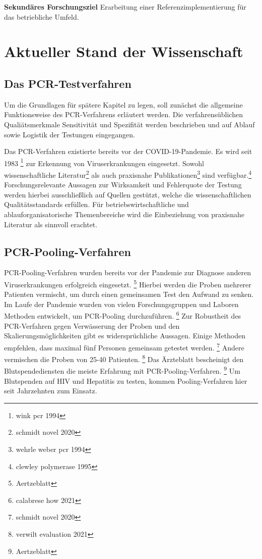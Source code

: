 \textbf{Sekundäres Forschungsziel}\newline 
Erarbeitung einer Referenzimplementierung für das betriebliche Umfeld.\newline

\section{Aktueller Stand der Wissenschaft}
\subsection{Das PCR-Testverfahren}
Um die Grundlagen für spätere Kapitel zu legen, soll zunächst die allgemeine Funktionsweise des PCR-Verfahrens erläutert werden.
Die verfahrensüblichen Qualiätsmerkmale Sensitivität und Spezifität werden beschrieben und auf Ablauf sowie Logistik der Testungen eingegangen.

Das PCR-Verfahren existierte bereits vor der COVID-19-Pandemie.
Es wird seit 1983
\footnote{wink pcr 1994}
zur Erkennung von Viruserkrankungen eingesetzt.
Sowohl wissenschaftliche Literatur\footnote{schmidt novel 2020}
als auch praxisnahe Publikationen\footnote{wehrle weber pcr 1994}
sind verfügbar.\footnote{clewley polymerase 1995}
Forschungsrelevante Aussagen zur Wirksamkeit und Fehlerquote der Testung werden hierbei ausschließlich auf Quellen gestützt, welche die wissenschaftlichen Qualitätsstandards erfüllen.
Für betriebswirtschaftliche und ablauforganisatorische Themenbereiche wird die Einbeziehung von praxisnahe Literatur als sinnvoll erachtet.

\subsection{PCR-Pooling-Verfahren}
PCR-Pooling-Verfahren wurden bereits vor der Pandemie zur Diagnose anderen Viruserkrankungen erfolgreich eingesetzt.
\footnote{Aertzeblatt}
Hierbei werden die Proben mehrerer Patienten vermischt, um durch einen gemeinsamen Test den Aufwand zu senken.
Im Laufe der Pandemie wurden von vielen Forschungsgruppen und Laboren Methoden entwickelt, um PCR-Pooling durchzuführen.
\footnote{calabrese how 2021}
Zur Robustheit des PCR-Verfahren gegen Verwässerung der Proben und den Skalierungsmöglichkeiten gibt es widersprüchliche Aussagen.
Einige Methoden empfehlen, dass maximal fünf Personen gemeinsam getestet werden.
\footnote{schmidt novel 2020}
Andere vermischen die Proben von 25-40 Patienten.
\footnote{verwilt evaluation 2021}
Das Ärzteblatt bescheinigt den Blutspendediensten die meiste Erfahrung mit PCR-Pooling-Verfahren.
\footnote{Aertzeblatt}
Um Blutspenden auf HIV und Hepatitis zu testen, kommen Pooling-Verfahren hier seit Jahrzehnten zum Einsatz.

